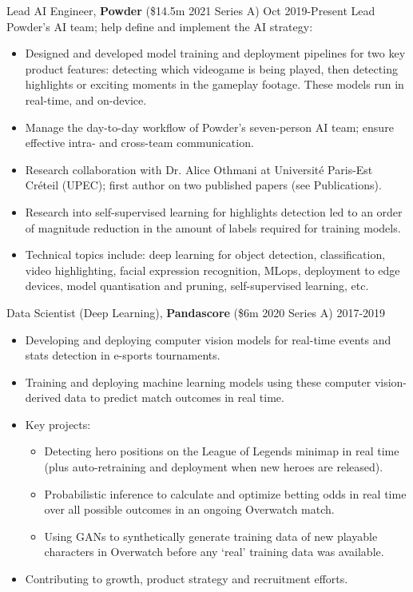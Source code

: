 \documentclass[margin]{res}
\begin{document}
\begin{resume}
		{Lead AI Engineer,} {\bf Powder} (\$14.5m 2021 Series A) \hfill Oct 2019-Present\vspace{2mm}\newline
        Lead Powder's AI team; help define and implement the AI strategy:
		\vspace{1mm}
		\begin{itemize}
			\item Designed and developed model training and deployment pipelines for two key product features: detecting which videogame is being played, then detecting highlights or exciting moments in the gameplay footage. These models run in real-time, and on-device.
			\item Manage the day-to-day workflow of Powder's seven-person AI team; ensure effective intra- and cross-team communication.
			\item Research collaboration with Dr.  Alice Othmani at Universit\'e Paris-Est Cr\'eteil (UPEC); first author on two published papers (see Publications).
			\item Research into self-supervised learning for highlights detection led to an order of magnitude reduction in the amount of labels required for training models.
			\item Technical topics include: deep learning for object detection, classification, video highlighting, facial expression recognition, MLops, deployment to edge devices, model quantisation and pruning, self-supervised learning, etc.
		\end{itemize}
		
		{Data Scientist (Deep Learning),} {\bf Pandascore} (\$6m 2020 Series A) \hfill 2017-2019
		\vspace{1mm}
		\begin{itemize}
			\item Developing and deploying computer vision models for real-time events and stats detection in e-sports tournaments.
			\item Training and deploying machine learning models using these computer vision-derived data to predict match outcomes in real time.
			\item Key projects:
			\begin{itemize}
				\item Detecting hero positions on the League of Legends minimap in real time (plus auto-retraining and deployment when new heroes are released).
				\item Probabilistic inference to calculate and optimize betting odds in real time over all possible outcomes in an ongoing Overwatch match.
				\item Using GANs to synthetically generate training data of new playable characters in Overwatch before any `real' training data was available.
			\end{itemize}
			\item Contributing to growth, product strategy and recruitment efforts.
		\end{itemize}
		

\end{resume}
\end{document}

